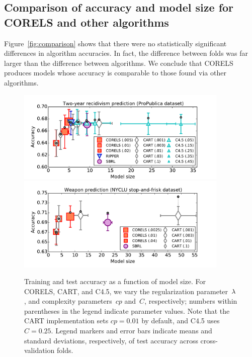 \subsection{Comparison of accuracy and model size for CORELS and other algorithms}
\label{sec:sparsity}

Figure~\ref{fig:comparison} shows that there were no statistically significant
differences in algorithm accuracies.
In fact, the difference between folds was far larger than the difference
between algorithms.
We conclude that CORELS produces models whose accuracy is comparable
to those found via other algorithms.

\begin{figure}[t!]
\begin{center}
\includegraphics[trim={12mm, 0mm, 24mm, 5mm},
width=0.9\textwidth]{figs/compas-sparsity-training.pdf}
\includegraphics[trim={12mm, 0mm, 24mm, 1mm},
width=0.9\textwidth]{figs/frisk-sparsity-training.pdf}
\end{center}
\caption{Training and test accuracy as a function of model size.
%
For CORELS, CART, and C4.5, we vary the regularization parameter~${\lambda}$,
and complexity parameters~$cp$ and~$C$, respectively;
numbers within parentheses in the legend indicate parameter values.
%
Note that the CART implementation sets ${cp = 0.01}$ by default,
and C4.5 uses ${C = 0.25}$.
%
Legend markers and error bars indicate means and standard deviations,
respectively, of test accuracy across cross-validation folds.
}
\end{figure}
